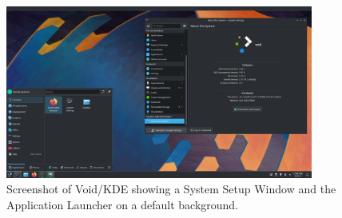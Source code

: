 %

\begin{figure}[!h]
  \centering
   \includegraphics[width=0.9\textwidth]{voidkdescreen.png}
  \caption{Screenshot of Void/KDE  showing a System Setup Window and the Application Launcher on a default background.}
  \label{fig:voidkde}
\end{figure}

%

